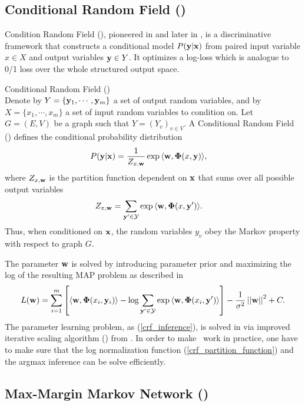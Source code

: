 \subsection{Conditional Random Field (\crf)}
Condition Random Field (\crf), pioneered in \citep{lafferty01} and later in \citep{taskar02}, is a discriminative framework that constructs a conditional model $P(\mathbf {y}|\mathbf {x})$ from paired input variable $x\in X$ and output variables $\mathbf {y}\in Y$.
It optimizes a log-loss which is analogue to 0/1 loss over the whole structured output space.
\begin{definition}{Conditional Random Field (\crf)}\\
	Denote by $Y=\{\mathbf {y}_1,\cdots,\mathbf {y}_m\}$ a set of output random variables, and by $X=\{x_1,\cdots,x_m\}$ a set of input random variables to condition on.
	Let $G=(E,V)$ be a graph such that $Y = (Y_v)_{v\in V}$.
	A Conditional Random Field (\crf) defines the conditional probability distribution
	\begin{align*}
		P(\mathbf {y}|\mathbf {x}) &= \frac{1}{Z_{x,\mathbf {w}}}\exp{\langle \mathbf {w}, \mathbf{\Phi}(x,\mathbf {y}) \rangle},
	\end{align*}
	where $Z_{x,\mathbf {w}}$ is the partition function dependent on $\mathbf {x}$ that sums over all possible output variables 
	\begin{align}
		Z_{x,\mathbf {w}} &= \sum_{\mathbf {y}'\in\mathcal{Y}}\exp{\langle \mathbf {w}, \mathbf{\Phi}(x,\mathbf {y}') \rangle}. \label{crf_partition_function}
	\end{align}
	Thus, when conditioned on $\mathbf {x}$, the random variables $y_v$ obey the Markov property with respect to graph $G$.
\end{definition}

The parameter $\mathbf {w}$ is solved by introducing parameter prior and maximizing the log of the resulting MAP problem as described in \citep{taskar02}
\begin{align}
	L(\mathbf {w}) = \sum_{i=1}^{m}\left[\langle \mathbf {w}, \mathbf{\Phi}(x_i,\mathbf {y}_i) \rangle-\log{\sum_{\mathbf {y}'\in\mathcal{Y}}{\exp{\langle \mathbf {w}, \mathbf{\Phi}(x_i,\mathbf {y}') \rangle}}}\right] - \frac{1}{\sigma^2}\left|\left| \mathbf {w} \right|\right|^2 + C. \label{crf_inference}
\end{align}
The parameter learning problem, as (\ref{crf_inference}), is solved in \citep{lafferty01} via improved iterative scaling algorithm (\iis) from \citep{Pietra97i}.
In order to make \crf\ work in practice, one have to make sure that the log normalization function (\ref{crf_partition_function}) and the argmax inference can be solve efficiently.


 


%
\subsection{Max-Margin Markov Network (\mmmn)}

